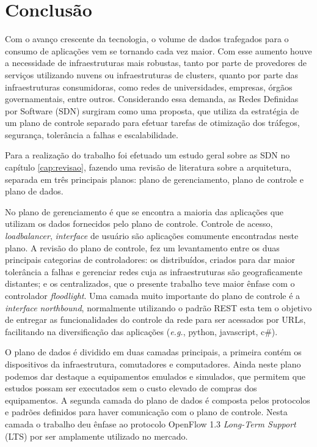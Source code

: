 \chapter{Conclusão}
\label{cap:conclusao}
Com o avanço crescente da tecnologia, o volume de dados trafegados para o consumo de aplicações vem se tornando cada vez maior. Com esse aumento houve a necessidade de infraestruturas mais robustas, tanto por parte de provedores de serviços utilizando nuvens ou infraestruturas de clusters, quanto por parte das infraestruturas consumidoras, como redes de universidades, empresas, órgãos governamentais, entre outros. Considerando essa demanda, as Redes Definidas por Software (SDN) surgiram como uma proposta, que utiliza da estratégia de um plano de controle separado para efetuar tarefas de otimização dos tráfegos, segurança, tolerância a falhas e escalabilidade. 

Para a realização do trabalho foi efetuado um estudo geral sobre as SDN no capítulo \ref{cap:revisao}, fazendo uma revisão de literatura sobre a arquitetura, separada em três principais planos: plano de gerenciamento, plano de controle e plano de dados. 

No plano de gerenciamento é que se encontra a maioria das aplicações que utilizam os dados fornecidos pelo plano de controle. Controle de acesso, \emph{loadbalancer}, \textit{interface} de usuário são aplicações comumente encontradas neste plano. A revisão do plano de controle, fez um levantamento entre os duas principais categorias de controladores: os distribuídos, criados para dar maior tolerância a falhas e gerenciar redes cuja as infraestruturas são geograficamente distantes; e os centralizados, que o presente trabalho teve maior ênfase com o controlador \emph{floodlight}. Uma camada muito importante do plano de controle é a \textit{interface} \emph{northbound}, normalmente utilizando o padrão REST esta tem o objetivo de entregar as funcionalidades do controle da rede para ser acessados por URLs, facilitando na diversificação das aplicações (\textit{e.g.}, python, javascript, c\#).

O plano de dados é dividido em duas camadas principais, a primeira contém os dispositivos da infraestrutura, comutadores e computadores. Ainda neste plano podemos dar destaque a equipamentos emulados e simulados, que permitem que estudos possam ser executados sem o custo elevado de compras dos equipamentos. A segunda camada do plano de dados é composta pelos protocolos e padrões definidos para haver comunicação com o plano de controle. Nesta camada o trabalho deu ênfase ao protocolo OpenFlow 1.3 \emph{Long-Term Support} (LTS) por ser amplamente utilizado no mercado.

